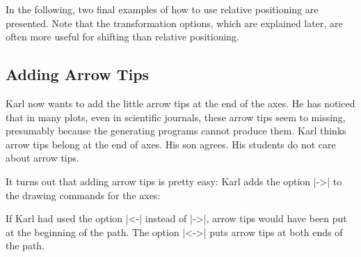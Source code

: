 In the following, two final examples of how to use relative
positioning are presented. Note that the transformation options,
which are explained later, are often more useful for shifting than
relative positioning. 

\begin{codeexample}[]
\end{codeexample}



\subsection{Adding Arrow Tips}

Karl now wants to add the little arrow tips at the end of the axes. He has
noticed that in many plots, even in scientific journals, these arrow tips
seem to missing, presumably because the generating programs cannot
produce them. Karl thinks arrow tips belong at the end of axes. His
son agrees. His students do not care about arrow tips.

It turns out that adding arrow tips is pretty easy: Karl adds the option
|->| to the drawing commands for the axes:

\begin{codeexample}[]
\end{codeexample}

If Karl had used the option |<-| instead of |->|, arrow tips would
have been put at the beginning of the path. The option |<->| puts
arrow tips at both ends of the path.

